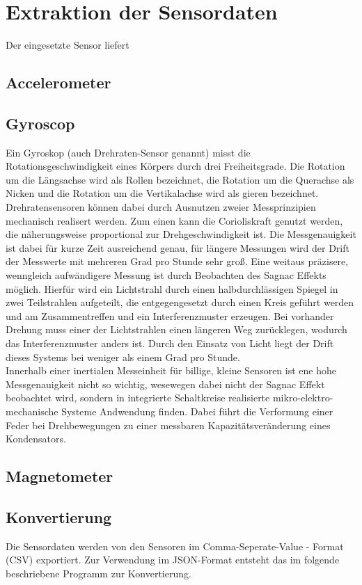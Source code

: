 \section{Extraktion der Sensordaten}
Der eingesetzte Sensor liefert
\subsection{Accelerometer}
\subsection{Gyroscop}
Ein Gyroskop (auch Drehraten-Sensor genannt) misst die Rotationsgeschwindigkeit eines Körpers durch drei Freiheitsgrade. Die Rotation um die Längsachse wird als Rollen bezeichnet, die Rotation um die Querachse als Nicken und die Rotation um die Vertikalachse wird als gieren bezeichnet. 
\\
Drehratensensoren können dabei durch Ausnutzen zweier Messprinzipien mechanisch realisert werden. Zum einen kann die Corioliskraft genutzt werden, die näherungsweise proportional zur Drehgeschwindigkeit ist. Die Messgenauigkeit ist dabei für kurze Zeit ausreichend genau, für längere Messungen wird der Drift der Messwerte mit mehreren Grad pro Stunde sehr groß. 
Eine weitaus präzisere, wenngleich aufwändigere Messung ist durch Beobachten des Sagnac Effekts möglich. Hierfür wird ein Lichtstrahl durch einen halbdurchlässigen Spiegel in zwei Teilstrahlen aufgeteilt, die entgegengesetzt durch einen Kreis geführt werden und am Zusammentreffen und ein Interferenzmuster erzeugen. Bei vorhander Drehung muss einer der Lichtstrahlen einen längeren Weg zurücklegen, wodurch das Interferenzmuster anders ist. Durch den Einsatz von Licht liegt der Drift dieses Systems bei weniger als einem Grad pro Stunde. 
\\
Innerhalb einer inertialen Messeinheit für billige, kleine Sensoren ist ene hohe Messgenauigkeit nicht so wichtig, wesewegen dabei nicht der Sagnac Effekt beobachtet wird, sondern in integrierte Schaltkreise realisierte mikro-elektro-mechanische Systeme Andwendung finden. Dabei führt die Verformung einer Feder bei Drehbewegungen zu einer messbaren Kapazitätsveränderung eines Kondensators.
\subsection{Magnetometer}
\subsection{Konvertierung}
Die Sensordaten werden von den Sensoren im Comma-Seperate-Value - Format (CSV) exportiert. Zur Verwendung im JSON-Format entsteht das im folgende beschriebene Programm zur Konvertierung.

%
%
%
%